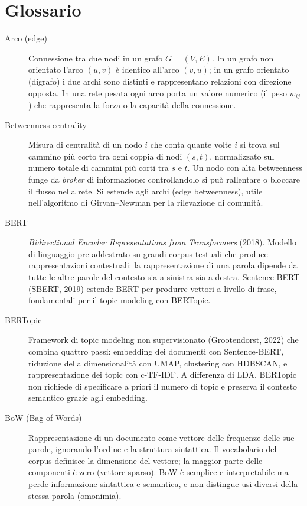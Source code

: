 \documentclass[12pt,a4paper]{article}
\begin{document}
\section{Glossario}
\begin{description}

  \item[Arco (edge)] Connessione tra due nodi in un grafo $G=(V,E)$. In un grafo non
  orientato l'arco $(u,v)$ è identico all'arco $(v,u)$; in un grafo orientato (digrafo)
  i due archi sono distinti e rappresentano relazioni con direzione opposta. In una rete
  pesata ogni arco porta un valore numerico (il peso $w_{ij}$) che rappresenta la forza
  o la capacità della connessione.

  \item[Betweenness centrality] Misura di centralità di un nodo $i$ che conta quante
  volte $i$ si trova sul cammino più corto tra ogni coppia di nodi $(s,t)$, normalizzato
  sul numero totale di cammini più corti tra $s$ e $t$. Un nodo con alta betweenness
  funge da \textit{broker} di informazione: controllandolo si può rallentare o bloccare
  il flusso nella rete. Si estende agli archi (edge betweenness), utile nell'algoritmo
  di Girvan–Newman per la rilevazione di comunità.

  \item[BERT] \textit{Bidirectional Encoder Representations from Transformers} (2018).
  Modello di linguaggio pre-addestrato su grandi corpus testuali che produce
  rappresentazioni contestuali: la rappresentazione di una parola dipende da tutte le
  altre parole del contesto sia a sinistra sia a destra. Sentence-BERT (SBERT, 2019)
  estende BERT per produrre vettori a livello di frase, fondamentali per il topic
  modeling con BERTopic.

  \item[BERTopic] Framework di topic modeling non supervisionato (Grootendorst, 2022)
  che combina quattro passi: embedding dei documenti con Sentence-BERT, riduzione della
  dimensionalità con UMAP, clustering con HDBSCAN, e rappresentazione dei topic con
  c-TF-IDF. A differenza di LDA, BERTopic non richiede di specificare a priori il numero
  di topic e preserva il contesto semantico grazie agli embedding.

  \item[BoW (Bag of Words)] Rappresentazione di un documento come vettore delle
  frequenze delle sue parole, ignorando l'ordine e la struttura sintattica. Il vocabolario
  del corpus definisce la dimensione del vettore; la maggior parte delle componenti è
  zero (vettore sparso). BoW è semplice e interpretabile ma perde informazione sintattica
  e semantica, e non distingue usi diversi della stessa parola (omonimia).


\end{description}
\end{document}
